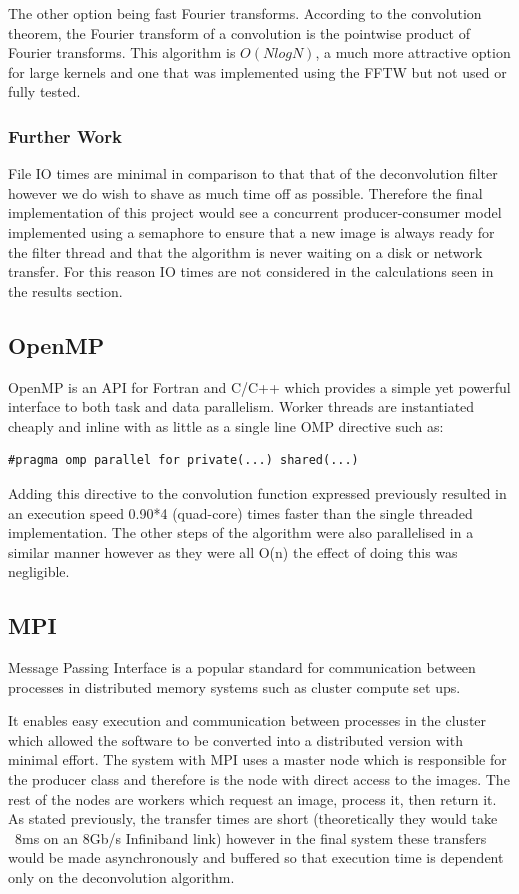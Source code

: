 \documentclass{article}
\begin{document}
The other option being fast Fourier transforms. According to the convolution
theorem, the Fourier transform of a convolution is the pointwise product of
Fourier transforms. This algorithm is $O(NlogN)$, a much more attractive option
for large kernels and one that was implemented using the FFTW but not used or
fully tested.

\subsubsection{Further Work}
File IO times are minimal in comparison to that that of the deconvolution filter
however we do wish to shave as much time off as possible. Therefore the final
implementation of this project would see a concurrent producer-consumer model
implemented using a semaphore to ensure that a new image is always ready for the
filter thread and that the algorithm is never waiting on a disk or network
transfer. For this reason IO times are not considered in the calculations seen
in the results section.

\subsection{OpenMP}
OpenMP is an API for Fortran and C/C++ which provides a simple yet powerful
interface to both task and data parallelism. Worker threads are instantiated
cheaply and inline with as little as a single line OMP directive such as:
\begin{verbatim}
#pragma omp parallel for private(...) shared(...)
\end{verbatim}

Adding this directive to the convolution function expressed previously resulted
in an execution speed 0.90*4 (quad-core) times faster than the single
threaded implementation. The other steps of the algorithm were also parallelised
in a similar manner however as they were all O(n) the effect of doing this was
negligible.

\subsection{MPI}
Message Passing Interface is a popular standard for communication between
processes in distributed memory systems such as cluster compute set ups.

It enables easy execution and communication between processes in the cluster
which allowed the software to be converted into a distributed version with
minimal effort. The system with MPI uses a master node which is responsible for
the producer class and therefore is the node with direct access to the images.
The rest of the nodes are workers which request an image, process it, then
return it. As stated previously, the transfer times are short (theoretically
they would take ~8ms on an 8Gb/s Infiniband link) however in the final system
these transfers would be made asynchronously and buffered so that execution time
is dependent only on the deconvolution algorithm.
\end{document}
